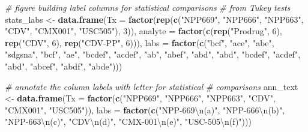 \documentclass[]{article}
\newenvironment{Shaded}{\begin{snugshade}}{\end{snugshade}}
\newcommand{\CharTok}[1]{\textcolor[rgb]{0.31,0.60,0.02}{#1}}
\newcommand{\CommentTok}[1]{\textcolor[rgb]{0.56,0.35,0.01}{\textit{#1}}}
\newcommand{\DataTypeTok}[1]{\textcolor[rgb]{0.13,0.29,0.53}{#1}}
\newcommand{\DecValTok}[1]{\textcolor[rgb]{0.00,0.00,0.81}{#1}}
\newcommand{\KeywordTok}[1]{\textcolor[rgb]{0.13,0.29,0.53}{\textbf{#1}}}
\newcommand{\NormalTok}[1]{#1}
\newcommand{\StringTok}[1]{\textcolor[rgb]{0.31,0.60,0.02}{#1}}
\begin{document}
\begin{Shaded}
\begin{Highlighting}[]
\CommentTok{# figure building label columns for statistical comparisons}
\CommentTok{# from Tukey tests}
\NormalTok{stats_labs <-}\StringTok{ }\KeywordTok{data.frame}\NormalTok{(}\DataTypeTok{Tx =} \KeywordTok{factor}\NormalTok{(}\KeywordTok{rep}\NormalTok{(}\KeywordTok{c}\NormalTok{(}\StringTok{"NPP669"}\NormalTok{, }\StringTok{"NPP666"}\NormalTok{, }
    \StringTok{"NPP663"}\NormalTok{, }\StringTok{"CDV"}\NormalTok{, }\StringTok{"CMX001"}\NormalTok{, }\StringTok{"USC505"}\NormalTok{), }\DecValTok{3}\NormalTok{)), }\DataTypeTok{analyte =} \KeywordTok{factor}\NormalTok{(}\KeywordTok{c}\NormalTok{(}\KeywordTok{rep}\NormalTok{(}\StringTok{"Prodrug"}\NormalTok{, }
    \DecValTok{6}\NormalTok{), }\KeywordTok{rep}\NormalTok{(}\StringTok{"CDV"}\NormalTok{, }\DecValTok{6}\NormalTok{), }\KeywordTok{rep}\NormalTok{(}\StringTok{"CDV-PP"}\NormalTok{, }\DecValTok{6}\NormalTok{))), }\DataTypeTok{labs =} \KeywordTok{factor}\NormalTok{(}\KeywordTok{c}\NormalTok{(}\StringTok{"bcf"}\NormalTok{, }
    \StringTok{"ace"}\NormalTok{, }\StringTok{"abe"}\NormalTok{, }\StringTok{"sdgsna"}\NormalTok{, }\StringTok{"bcf"}\NormalTok{, }\StringTok{"ae"}\NormalTok{, }\StringTok{"bcdef"}\NormalTok{, }\StringTok{"acdef"}\NormalTok{, }\StringTok{"ab"}\NormalTok{, }
    \StringTok{"abef"}\NormalTok{, }\StringTok{"abd"}\NormalTok{, }\StringTok{"abd"}\NormalTok{, }\StringTok{"bcdef"}\NormalTok{, }\StringTok{"acdef"}\NormalTok{, }\StringTok{"abd"}\NormalTok{, }\StringTok{"abcef"}\NormalTok{, }\StringTok{"abdf"}\NormalTok{, }
    \StringTok{"abde"}\NormalTok{)))}

\CommentTok{# annotate the column labels with letter for statistical}
\CommentTok{# comparisons}
\NormalTok{ann_text <-}\StringTok{ }\KeywordTok{data.frame}\NormalTok{(}\DataTypeTok{Tx =} \KeywordTok{factor}\NormalTok{(}\KeywordTok{c}\NormalTok{(}\StringTok{"NPP669"}\NormalTok{, }\StringTok{"NPP666"}\NormalTok{, }\StringTok{"NPP663"}\NormalTok{, }
    \StringTok{"CDV"}\NormalTok{, }\StringTok{"CMX001"}\NormalTok{, }\StringTok{"USC505"}\NormalTok{)), }\DataTypeTok{labs =} \KeywordTok{factor}\NormalTok{(}\KeywordTok{c}\NormalTok{(}\StringTok{"NPP-669}\CharTok{\textbackslash{}n}\StringTok{(a)"}\NormalTok{, }
    \StringTok{"NPP-666}\CharTok{\textbackslash{}n}\StringTok{(b)"}\NormalTok{, }\StringTok{"NPP-663}\CharTok{\textbackslash{}n}\StringTok{(c)"}\NormalTok{, }\StringTok{"CDV}\CharTok{\textbackslash{}n}\StringTok{(d)"}\NormalTok{, }\StringTok{"CMX-001}\CharTok{\textbackslash{}n}\StringTok{(e)"}\NormalTok{, }
    \StringTok{"USC-505}\CharTok{\textbackslash{}n}\StringTok{(f)"}\NormalTok{)))}


\end{Highlighting}
\end{Shaded}
\end{document}
